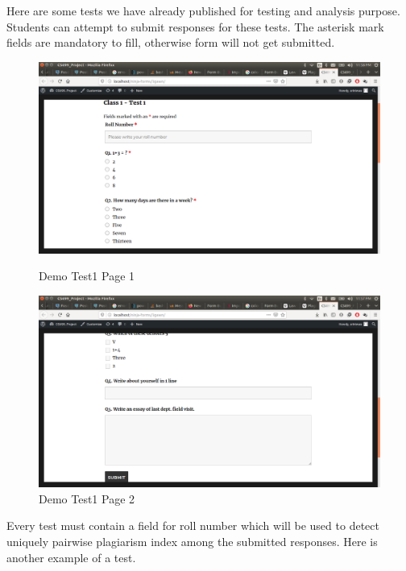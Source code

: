 Here are some tests we have already published for testing and analysis purpose. Students can attempt to submit responses for these tests. The asterisk mark fields are mandatory to fill, otherwise form will not get submitted.
\begin{figure}[H]
\label{fig1}
      \centering
  \begin{minipage}[b]{0.45\textwidth}
    \includegraphics[width=\textwidth]{images/Test11.png}
    \caption{Demo Test1 Page 1}
  \end{minipage}
  \hfill
  \begin{minipage}[b]{0.45\textwidth}
    \includegraphics[width=\textwidth]{images/Test12.png}
    \caption{Demo Test1 Page 2}
  \end{minipage}
  \hfill
\end{figure} 
Every test must contain a field for roll number which will be used to detect uniquely pairwise plagiarism index among the submitted responses. Here is another example of a test.

